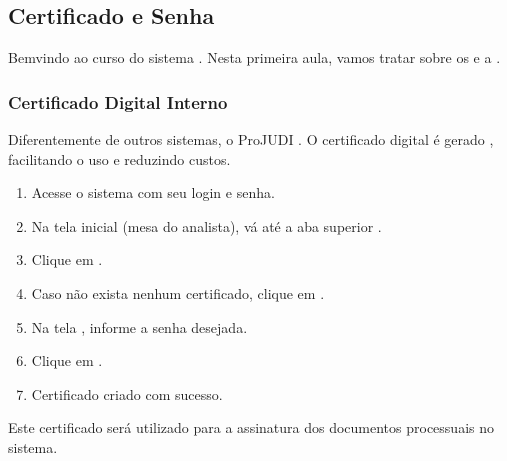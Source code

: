 \documentclass[letterpaper,10pt,brazil]{sphinxmanual}
\begin{document}
\subsection{Certificado e Senha}
\label{\detokenize{projud_02_senhacertificado:certificado-e-senha}}\label{\detokenize{projud_02_senhacertificado::doc}}
\sphinxAtStartPar
Bem\sphinxhyphen{}vindo ao curso do sistema . Nesta primeira aula, vamos tratar sobre os  e a .


\subsubsection{Certificado Digital Interno}
\label{\detokenize{projud_02_senhacertificado:certificado-digital-interno}}
\sphinxAtStartPar
Diferentemente de outros sistemas, o ProJUDI . O certificado digital é gerado , facilitando o uso e reduzindo custos.

\sphinxAtStartPar
{}
\begin{enumerate}
%
\item {} 
\sphinxAtStartPar
Acesse o sistema com seu login e senha.

\item {} 
\sphinxAtStartPar
Na tela inicial (mesa do analista), vá até a aba superior .

\item {} 
\sphinxAtStartPar
Clique em .

\item {} 
\sphinxAtStartPar
Caso não exista nenhum certificado, clique em .

\item {} 
\sphinxAtStartPar
Na tela , informe a senha desejada.

\item {} 
\sphinxAtStartPar
Clique em .

\item {} 
\sphinxAtStartPar
Certificado criado com sucesso.

\end{enumerate}

\sphinxAtStartPar
{} Este certificado será utilizado para a assinatura dos documentos processuais no sistema.
\end{document}
